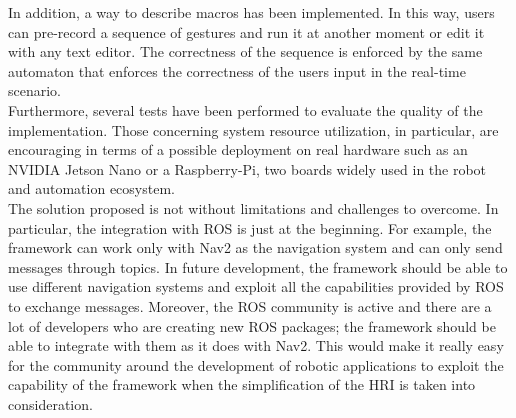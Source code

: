 \documentclass[../thesis.tex]{subfiles}
\begin{document}
In addition, a way to describe macros has been implemented. In this way, users can pre-record a sequence of gestures and run it at another moment or edit it with any text editor. The correctness of the sequence is enforced by the same automaton that enforces the correctness of the users input in the real-time scenario.\\

Furthermore, several tests have been performed to evaluate the quality of the implementation. Those concerning system resource utilization, in particular, are encouraging in terms of a possible deployment on real hardware such as an NVIDIA Jetson Nano or a Raspberry-Pi, two boards widely used in the robot and automation ecosystem.\\

The solution proposed is not without limitations and challenges to overcome. In particular, the integration with \gls{ROS} is just at the beginning. For example, the framework can work only with Nav2 as the navigation system and can only send messages through topics. In future development, the framework should be able to use different navigation systems and exploit all the capabilities provided by \gls{ROS} to exchange messages. Moreover, the \gls{ROS} community is active and there are a lot of developers who are creating new \gls{ROS} packages; the framework should be able to integrate with them as it does with Nav2. This would make it really easy for the community around the development of robotic applications to exploit the capability of the framework when the simplification of the \gls{HRI} is taken into consideration.
\end{document}
